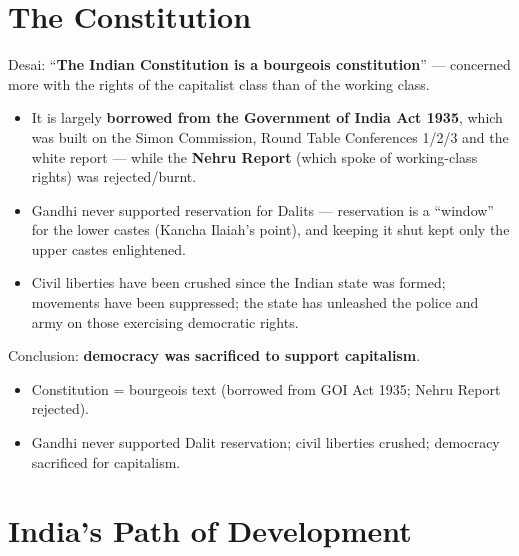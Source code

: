 \section{The Constitution}

\begin{KeyConcept}
Desai: ``\textbf{The Indian Constitution is a bourgeois constitution}'' --- concerned more with the rights of the capitalist class than of the working class.
\end{KeyConcept}

\begin{itemize}
\item It is largely \textbf{borrowed from the Government of India Act 1935}, which was built on the Simon Commission, Round Table Conferences 1/2/3 and the white report --- while the \textbf{Nehru Report} (which spoke of working-class rights) was rejected/burnt.
\item Gandhi never supported reservation for Dalits --- reservation is a ``window'' for the lower castes (Kancha Ilaiah's point), and keeping it shut kept only the upper castes enlightened.
\item Civil liberties have been crushed since the Indian state was formed; movements have been suppressed; the state has unleashed the police and army on those exercising democratic rights.
\end{itemize}

\begin{CriticalPoint}
Conclusion: \textbf{democracy was sacrificed to support capitalism}.
\end{CriticalPoint}

\begin{QuickRevision}
\begin{itemize}
\item Constitution = bourgeois text (borrowed from GOI Act 1935; Nehru Report rejected).
\item Gandhi never supported Dalit reservation; civil liberties crushed; democracy sacrificed for capitalism.
\end{itemize}
\end{QuickRevision}

\section{India's Path of Development}

